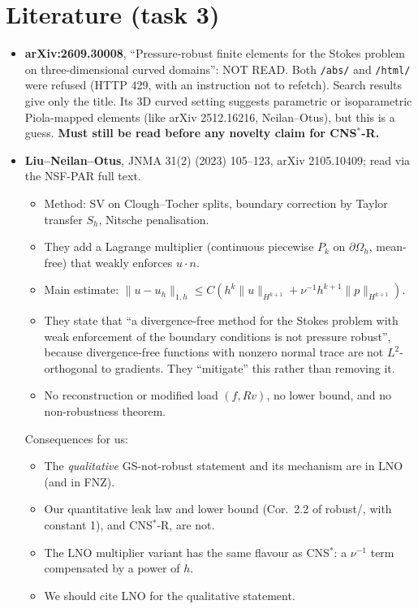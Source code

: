\documentclass[11pt]{article}
\theoremstyle{remark}
\begin{document}
\section{Literature (task 3)}
\begin{itemize}
\item \textbf{arXiv:2609.30008}, ``Pressure-robust finite elements for the Stokes problem on three-dimensional curved
domains'': NOT READ. Both \texttt{/abs/} and \texttt{/html/} were refused (HTTP 429, with an instruction not to refetch).
Search results give only the title. Its 3D curved setting suggests parametric or isoparametric Piola-mapped elements (like
arXiv 2512.16216, Neilan--Otus), but this is a guess. \textbf{Must still be read before any novelty claim for CNS$^\ast$-R.}
\item \textbf{Liu--Neilan--Otus}, JNMA 31(2) (2023) 105--123, arXiv 2105.10409; read via the NSF-PAR full text.
\begin{itemize}
\item Method: SV on Clough--Tocher splits, boundary correction by Taylor transfer $S_h$, Nitsche penalisation.
\item They add a Lagrange multiplier (continuous piecewise $P_k$ on $\partial\Omega_h$, mean-free) that weakly enforces
$u\cdot n$.
\item Main estimate: $\|u-u_h\|_{1,h}\le C(h^k\|u\|_{H^{k+1}}+\nu^{-1}h^{k+1}\|p\|_{H^{k+1}})$.
\item They state that ``a divergence-free method for the Stokes problem with weak enforcement of the boundary conditions is
not pressure robust'', because divergence-free functions with nonzero normal trace are not $L^2$-orthogonal to gradients.
They ``mitigate'' this rather than removing it.
\item No reconstruction or modified load $(f,Rv)$, no lower bound, and no non-robustness theorem.
\end{itemize}
Consequences for us:
\begin{itemize}
\item The \emph{qualitative} GS-not-robust statement and its mechanism are in LNO (and in FNZ).
\item Our quantitative leak law and lower bound (Cor.~2.2 of robust/, with constant 1), and CNS$^\ast$-R, are not.
\item The LNO multiplier variant has the same flavour as CNS$^\ast$: a $\nu^{-1}$ term compensated by a power of $h$.
\item We should cite LNO for the qualitative statement.
\end{itemize}

\end{itemize}
\end{document}

